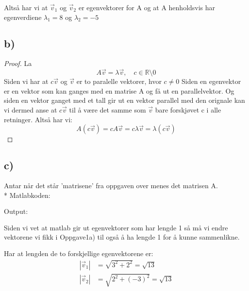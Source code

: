 \documentclass[a4paper, norsk, twoside, 10pt]{article}
\begin{document}
Altså har vi at $\vec{v}_{1}$ og $\vec{v}_{2}$ er egenvektorer for A og at A henholdsvis har egenverdiene $\lambda_{1} = 8$ og $\lambda_{2} = -5$




\subsection*{b)}
\begin{proof}
La \[A\vec{v} = \lambda\vec{v}, \quad c \in \mathbb{R}\setminus{0}\]
Siden vi har at $c\vec{v}$ og $\vec{v}$ er to paralelle vektorer, hvor $c \ne 0$ Siden en egenvektor er en vektor som kan ganges med en matrise A og få ut en parallelvektor. Og siden en vektor ganget med et tall gir ut en vektor parallel med den orignale kan vi dermed anse at $c\vec{v}$ til å være det samme som $\vec{v}$ bare forskjøvet c i alle retninger. Altså har vi:
\[A(c\vec{v}) = cA\vec{v} = c\lambda\vec{v} = \lambda(c\vec{v})\]
\end{proof}





\subsection*{c)}
Antar når det står 'matrisene' fra oppgaven over menes det matrisen A. \\*
Matlabkoden:

Output:


Siden vi vet at matlab gir ut egenvektorer som har lengde 1 så må vi endre vektorene vi fikk i Oppgave1a) til også å ha lengde 1 for å kunne sammenlikne.

Har at lengden de to forskjellige egenvektorene er:
\[\begin{split}|\vec{v}_{1}| &= \sqrt{3^{2} + 2^{2}} = \sqrt{13}\\
|\vec{v}_{2}| &= \sqrt{2^{2} + (-3)^{2}} = \sqrt{13}\end{split}\]
\end{document}
